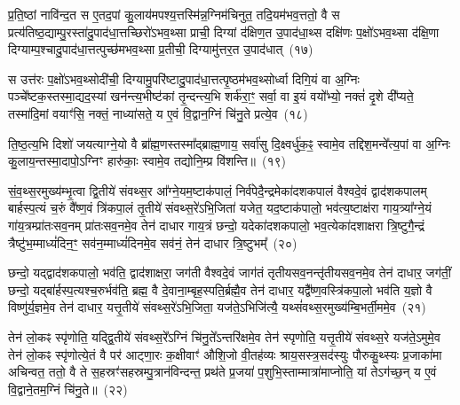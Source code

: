 प्र॒ति॒ष्ठां नावि॑न्द॒त स ए॒तद॒पां कु॒लाय॑मपश्य॒त्तस्मि॑न्न॒ग्निम॑चिनुत॒ तदि॒यम॑भव॒त्ततो॒ वै स प्रत्य॑तिष्ठ॒द्याम्पु॒रस्ता॑दु॒पा\-द॑धा॒त्तच्छिरो॑\-ऽभव॒थ्सा प्राची॒ दिग्यां द॑क्षिण॒त उ॒पाद॑धा॒थ्स दक्षि॑णः प॒क्षो॑\-ऽभव॒थ्सा द॑क्षि॒णा दिग्याम्प॒श्चादु॒पा\-द॑धा॒त्तत्पुच्छ॑मभव॒थ्सा प्र॒तीची॒ दिग्यामु॑त्तर॒त उ॒पाद॑धात्~(१७)

स उत्त॑रः प॒क्षो॑\-ऽभव॒थ्सोदी॑ची॒ दिग्यामु॒परि॑ष्टादु॒पाद॑धा॒त्तत्पृ॒ष्ठम॑भव॒थ्सोर्ध्वा दिगि॒यं वा अ॒ग्निः पञ्चे᳚ष्टक॒स्तस्मा॒द्यद॒स्यां खन॑न्त्य॒भीष्ट॑कां तृ॒न्दन्त्य॒भि शर्क॑रा॒ꣳ॒ सर्वा॒ वा इ॒यं वयो᳚भ्यो॒ नक्तं॑ दृ॒शे दी᳚प्यते॒ तस्मा॑दि॒मां वयाꣳ॑सि॒ नक्तं॒ नाध्या॑सते॒ य ए॒वं वि॒द्वान॒ग्निं चि॑नु॒ते प्रत्ये॒व~(१८)

ति॒ष्ठ॒त्य॒भि दिशो॑ जयत्याग्ने॒यो वै ब्रा᳚ह्म॒णस्तस्मा᳚द्ब्राह्म॒णाय॒ सर्वा॑सु दि॒क्ष्वर्धु॑क॒ꣴ॒ स्वामे॒व तद्दिश॒मन्वे᳚त्य॒पां वा अ॒ग्निः कु॒लाय॒न्तस्मा॒दापो॒\-ऽग्निꣳ हारु॑काः॒ स्वामे॒व तद्योनि॒म्प्र वि॑शन्ति॥~(१९)

{\anuvakamend[{यद॑लेलाय॒थ्स उ॑त्तर॒त उ॒पाद॑धादे॒व द्वात्रिꣳ॑शच्च}]}%

सं॒व॒थ्स॒रमुख्य॑म्भृ॒त्वा द्वि॒तीये॑ संवथ्स॒र आ᳚ग्ने॒यम॒ष्टा\-क॑पालं॒ निर्व॑पेदै॒न्द्रमेका॑\-दश\-कपालं वैश्वदे॒वं द्वाद॑श\-कपालम् बार्\mbox{}हस्प॒त्यं च॒रुं वै᳚ष्ण॒वं त्रि॑कपा॒लं तृ॒तीये॑ संवथ्स॒रे॑\-ऽभि॒जिता॑ यजेत॒ यद॒ष्टाक॑पालो॒ भव॑त्य॒ष्टाक्ष॑रा गाय॒त्र्या᳚ग्ने॒यं गा॑य॒त्रम्प्रा॑तःसव॒नम् प्रा॑तःसव॒नमे॒व तेन॑ दाधार गाय॒त्रं छन्दो॒ यदेका॑\-दश\-कपालो॒ भव॒त्येका॑\-दशाक्षरा त्रि॒ष्टुगै॒न्द्रं त्रैष्टु॑भ॒म्माध्यं॑दिन॒ꣳ॒ सव॑न॒म्माध्यं॑दिनमे॒व सव॑नं॒ तेन॑ दाधार त्रि॒ष्टुभम्᳚~(२०)

छन्दो॒ यद्द्वाद॑श\-कपालो॒ भव॑ति॒ द्वाद॑शाक्षरा॒ जग॑ती वैश्वदे॒वं जाग॑तं तृतीयसव॒नन्तृ॑तीयसव॒नमे॒व तेन॑ दाधार॒ जग॑तीं॒ छन्दो॒ यद्बा॑र्\mbox{}हस्प॒त्यश्च॒रुर्भव॑ति॒ ब्रह्म॒ वै दे॒वाना॒म्बृह॒स्पति॒र्ब्रह्मै॒व तेन॑ दाधार॒ यद्वै᳚ष्ण॒वस्त्रि॑कपा॒लो भव॑ति य॒ज्ञो वै विष्णु॑र्य॒ज्ञमे॒व तेन॑ दाधार॒ यत्तृ॒तीये॑ संवथ्स॒रे॑\-ऽभि॒जिता॒ यज॑ते॒\-ऽभिजि॑त्यै॒ यथ्सं॑वथ्स॒रमुख्य॑म्बि॒भर्ती॒ममे॒व~(२१)

तेन॑ लो॒कꣴ स्पृ॑णोति॒ यद्द्वि॒तीये॑ संवथ्स॒रे᳚\-ऽग्निं चि॑नु॒ते᳚\-ऽन्तरि॑क्षमे॒व तेन॑ स्पृणोति॒ यत्तृ॒तीये॑ संवथ्स॒रे यज॑ते॒\-ऽमुमे॒व तेन॑ लो॒कꣴ स्पृ॑णोत्ये॒तं वै पर॑ आट्णा॒रः क॒क्षीवाꣳ॑ औशि॒जो वी॒तह॑व्यः श्राय॒सस्त्र॒सद॑स्युः पौरुकु॒थ्स्यः प्र॒जाका॑मा अचिन्वत॒ ततो॒ वै ते स॒हस्रꣳ॑सहस्रम्पु॒त्रान॑विन्दन्त॒ प्रथ॑ते प्र॒जया॑ प॒शुभि॒स्ताम्मात्रा॑माप्नोति॒ यां ते\-ऽग॑च्छ॒न् य ए॒वं वि॒द्वाने॒तम॒ग्निं चि॑नु॒ते॥~(२२)

{\anuvakamend[{दा॒धा॒र॒ त्रि॒ष्टुभ॑मि॒ममे॒वैवं च॒त्वारि॑ च}]}%

